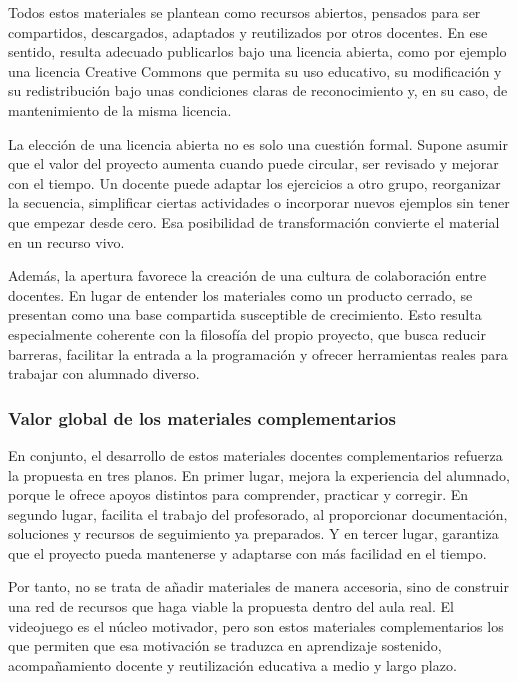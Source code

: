 \documentclass[a4paper,12pt]{article}
\begin{document}
Todos estos materiales se plantean como recursos abiertos, pensados para ser compartidos, descargados, adaptados y reutilizados por otros docentes. En ese sentido, resulta adecuado publicarlos bajo una licencia abierta, como por ejemplo una licencia Creative Commons que permita su uso educativo, su modificación y su redistribución bajo unas condiciones claras de reconocimiento y, en su caso, de mantenimiento de la misma licencia.

La elección de una licencia abierta no es solo una cuestión formal. Supone asumir que el valor del proyecto aumenta cuando puede circular, ser revisado y mejorar con el tiempo. Un docente puede adaptar los ejercicios a otro grupo, reorganizar la secuencia, simplificar ciertas actividades o incorporar nuevos ejemplos sin tener que empezar desde cero. Esa posibilidad de transformación convierte el material en un recurso vivo.

Además, la apertura favorece la creación de una cultura de colaboración entre docentes. En lugar de entender los materiales como un producto cerrado, se presentan como una base compartida susceptible de crecimiento. Esto resulta especialmente coherente con la filosofía del propio proyecto, que busca reducir barreras, facilitar la entrada a la programación y ofrecer herramientas reales para trabajar con alumnado diverso.

\subsubsection{Valor global de los materiales complementarios}

En conjunto, el desarrollo de estos materiales docentes complementarios refuerza la propuesta en tres planos. En primer lugar, mejora la experiencia del alumnado, porque le ofrece apoyos distintos para comprender, practicar y corregir. En segundo lugar, facilita el trabajo del profesorado, al proporcionar documentación, soluciones y recursos de seguimiento ya preparados. Y en tercer lugar, garantiza que el proyecto pueda mantenerse y adaptarse con más facilidad en el tiempo.

Por tanto, no se trata de añadir materiales de manera accesoria, sino de construir una red de recursos que haga viable la propuesta dentro del aula real. El videojuego es el núcleo motivador, pero son estos materiales complementarios los que permiten que esa motivación se traduzca en aprendizaje sostenido, acompañamiento docente y reutilización educativa a medio y largo plazo.
\end{document}
